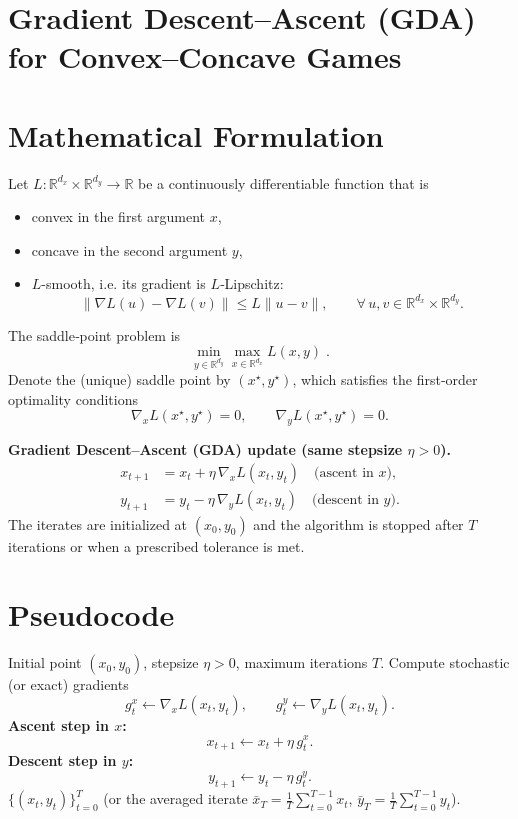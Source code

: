 \documentclass{article}
\newcommand{\R}{\mathbb{R}}
\begin{document}
\section*{Gradient Descent–Ascent (GDA) for Convex–Concave Games}

\section*{Mathematical Formulation}
Let $L:\R^{d_x}\times\R^{d_y}\rightarrow\R$ be a continuously differentiable function that is
\begin{itemize}
    \item convex in the first argument $x$,
    \item concave in the second argument $y$,
    \item $L$-smooth, i.e. its gradient is $L$‑Lipschitz:
    \[
        \big\|\nabla L(u)-\nabla L(v)\big\| \le L\|u-v\|,\qquad
        \forall\,u,v\in\R^{d_x}\times\R^{d_y}.
    \]
\end{itemize}
The saddle‑point problem is
\[
    \min_{y\in\R^{d_y}}\max_{x\in\R^{d_x}} L(x,y)\; .
\]
Denote the (unique) saddle point by $(x^\star,y^\star)$, which satisfies the first‑order optimality conditions
\[
    \nabla_x L(x^\star,y^\star)=0,\qquad \nabla_y L(x^\star,y^\star)=0 .
\]

\bigskip
\noindent\textbf{Gradient Descent–Ascent (GDA) update (same stepsize $\eta>0$).}
\begin{align}
    x_{t+1} &= x_t + \eta \,\nabla_x L(x_t,y_t) \quad\text{(ascent in $x$)}, \label{eq:ascent}\\
    y_{t+1} &= y_t - \eta \,\nabla_y L(x_t,y_t) \quad\text{(descent in $y$)} . \label{eq:descent}
\end{align}
The iterates are initialized at $(x_0,y_0)$ and the algorithm is stopped after $T$ iterations or when a prescribed tolerance is met.

\section*{Pseudocode}
\begin{algorithm}[H]
\caption{Gradient Descent–Ascent (GDA)}
\begin{algorithmic}[1]
\Require Initial point $(x_0,y_0)$, stepsize $\eta>0$, maximum iterations $T$.
    \State Compute stochastic (or exact) gradients 
    \[
        g^x_t \gets \nabla_x L(x_t,y_t),\qquad 
        g^y_t \gets \nabla_y L(x_t,y_t).
    \]
    \State \textbf{Ascent step in $x$:}
    \[
        x_{t+1} \gets x_t + \eta\, g^x_t .
    \]
    \State \textbf{Descent step in $y$:}
    \[
        y_{t+1} \gets y_t - \eta\, g^y_t .
    \]
\EndFor
\State \Return $\{(x_t,y_t)\}_{t=0}^T$ (or the averaged iterate $\bar x_T=\tfrac1T\sum_{t=0}^{T-1}x_t$, $\bar y_T=\tfrac1T\sum_{t=0}^{T-1}y_t$).
\end{algorithmic}
\end{algorithm}
\end{document}
